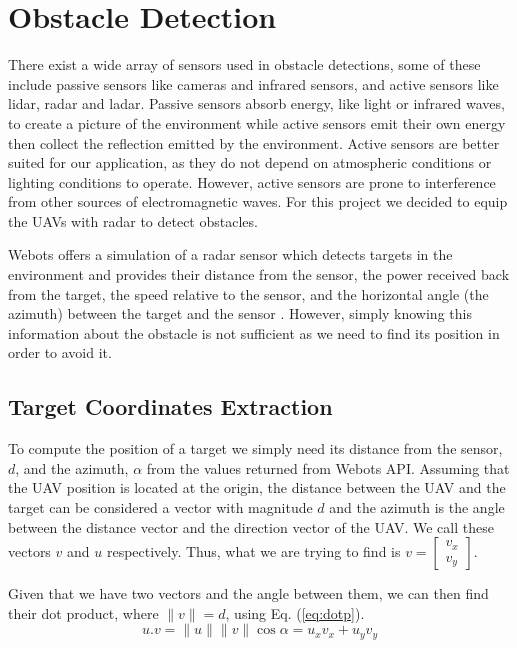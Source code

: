 \section{Obstacle Detection}

There exist a wide array of sensors used in obstacle detections, some of these include passive
sensors like cameras and infrared sensors, and active sensors like lidar, radar and ladar. 
Passive sensors absorb energy, like light or infrared waves, to create a picture of the 
environment while active sensors emit their own energy then collect the reflection emitted
by the environment. Active sensors are better suited for our application, as they do not
depend on atmospheric conditions or lighting conditions to operate. However, active sensors
are prone to interference from other sources of electromagnetic waves. \autocite{4432828}
For this project we decided to equip the UAVs with radar to detect obstacles. 

Webots offers a simulation of a radar sensor which detects targets in the environment and 
provides their distance from the sensor, the power received back from the target, the speed relative 
to the sensor, and the horizontal angle (the azimuth) between the target and the sensor \autocite{Webots}.
However, simply knowing this information about the obstacle is not sufficient as we need to find
its position in order to avoid it.

\subsection{Target Coordinates Extraction}

To compute the position of a target we simply need its distance from the sensor, $d$, and the azimuth, 
$\alpha$ from the values returned from Webots API. Assuming that the UAV position is located at the origin,
the distance between the UAV and the target can be considered a vector with magnitude $d$ and the 
azimuth is the angle between the distance vector and the direction vector of the UAV. We call these
vectors $v$ and $u$ respectively. Thus, what we are trying to find is $v = \begin{bmatrix} v_x \\ v_y \end{bmatrix}$.

Given that we have two vectors and the angle between them, we can then find their dot product, where
$\parallel v \parallel = d$, using Eq. (\ref{eq:dotp}).
\begin{equation}
	u . v = \parallel u \parallel \parallel v \parallel \cos \alpha = u_x v_x + u_y v_y
	\label{eq:dotp}
\end{equation}


